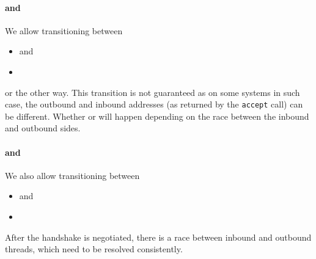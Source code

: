 \paragraph{\SelfConn{} and \SelfConnRev{}}
We allow transitioning between
\begin{itemize}
  \item\UnnegotiatedStateOut{} and
  \item\UnnegotiatedStateIn{}
\end{itemize}
or the other way.  This transition is not guaranteed as on some systems in
such case, the outbound and inbound addresses (as returned by the
\texttt{accept} call) can be different.  Whether \SelfConn{} or \SelfConnRev{}
will happen depending on the race between the inbound and outbound sides.

\paragraph{\SelfConnPrim{} and \SelfConnPrimRev{}}
We also allow transitioning between
\begin{itemize}
  \item\InboundIdleStateAny{} and
  \item\OutboundStateAny{}
\end{itemize}

After the handshake is negotiated, there is a race between inbound and outbound
threads, which need to be resolved consistently.

